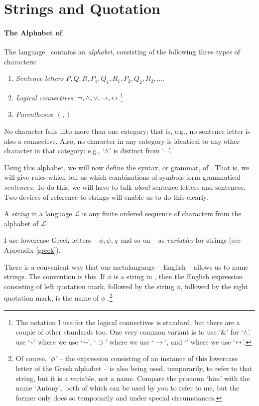 

\section{Strings and Quotation}

\paragraph{The Alphabet of \lone}
The language \lone\ contains an \emph{alphabet}, consisting of the following three types of characters: \begin{enumerate}
	\item \emph{Sentence letters} $P,Q,R,P_{1},Q_{1},R_{1},P_{2},Q_{2},R_{2},\ldots$.
	\item  \emph{Logical connectives}: $\neg, \wedge, \vee, \to, \leftrightarrow$.\footnote{The notation I use for the logical connectives is standard, but there are a couple of other standards too. One very common variant is to use `\&' for `$\wedge$'. \citet[25]{bevpospa} use `\sim' where we use `¬', `$\supset$' where we use `$\to$', and `\equiv' where we use `$\leftrightarrow$'.}
	\item \emph{Parentheses}: $(,)$
\end{enumerate}
No character falls into more than one category; that is, e.g., no sentence letter is also a connective. Also, no character in any category is identical to any other character in that category: e.g., `$\wedge$' is distinct from `$\neg$'.

Using this alphabet, we will now define the syntax, or grammar, of \lone. That is, we will give rules which tell us which combinations of symbols form grammatical \emph{sentences}. To do this, we will have to talk \emph{about} sentence letters and sentences. Two devices of reference to strings will enable us to do this clearly.

\begin{definition}[String]
	A \emph{string} in a language $\mathcal{L}$ is any finite ordered sequence of characters from the alphabet of $\mathcal{L}$.
\end{definition}
 I use lowercase Greek letters – $\phi, \psi, \chi$ and so on – as \emph{variables} for strings (see Appendix \ref{greek}). 

 There is a convenient way that our metalanguage – English – allows us to name strings. The convention is this. If $\phi$ is a string in \lone, then the English expression consisting of left quotation mark, followed by the string $\phi$, followed by the right quotation mark, is the name of $\phi$ \citep[397]{richard}.\footnote{Of course, ‘$\phi$’ – the expression consisting of an instance of this lowercase letter of the Greek alphabet – is also being used, temporarily, to refer to that string, but it is a variable, not a name. Compare the pronoun `him' with the name ‘Antony’, both of which can be used by you to refer to me, but the former only does so temporarily and under special circumstances.} 

